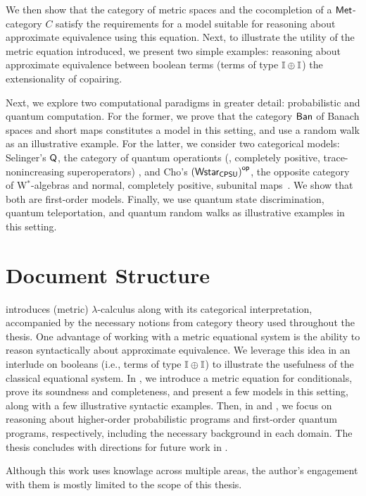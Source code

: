 We then show that the category of metric spaces and the cocompletion of a $ \mathsf{Met} $-category $ C $ satisfy the requirements for a model suitable for reasoning about approximate equivalence using this equation.  Next, to illustrate the utility of the metric equation introduced, we present two simple examples: reasoning about approximate equivalence between boolean terms (\ie terms of type $ \mathbb{I} \oplus \mathbb{I} $) the extensionality of copairing.


Next, we explore two computational paradigms in greater detail: probabilistic and quantum computation. For the former, we prove that the category $ \mathsf{Ban} $ of Banach spaces and short maps constitutes a model in this setting, and use a random walk as an illustrative example. For the latter, we consider two categorical models: Selinger’s \( \mathsf{Q} \), the category of quantum operationts (\ie, completely positive, trace-nonincreasing superoperators) \cite{selinger2004towards}, and Cho’s \( \left(\mathsf{Wstar_{CPSU}}\right)^{\mathsf{op}} \), the opposite category of W$^*$-algebras and normal, completely positive, subunital maps~\cite{choSemanticsQuantumProgramming2016}. We show that both are first-order models. Finally, we use quantum state discrimination, quantum teleportation, and quantum random walks as illustrative examples in this setting.




\section{Document Structure}

 introduces (metric) $\lambda$-calculus along with its categorical interpretation, accompanied by the necessary notions from category theory used throughout the thesis. One advantage of working with a metric equational system is the ability to reason syntactically about approximate equivalence. We leverage this idea in an interlude on booleans (i.e., terms of type $\mathbb{I} \oplus \mathbb{I}$) to illustrate the usefulness of the classical equational system. In , we introduce a metric equation for conditionals, prove its soundness and completeness, and present a few models in this setting, along with a few illustrative syntactic examples. Then, in  and , we focus on reasoning about higher-order probabilistic programs and first-order quantum programs, respectively,  including the necessary background in each domain. The thesis concludes with directions for future work in .

Although this work uses knowlage across multiple areas, the author's engagement with them is mostly limited to the scope of this thesis.


